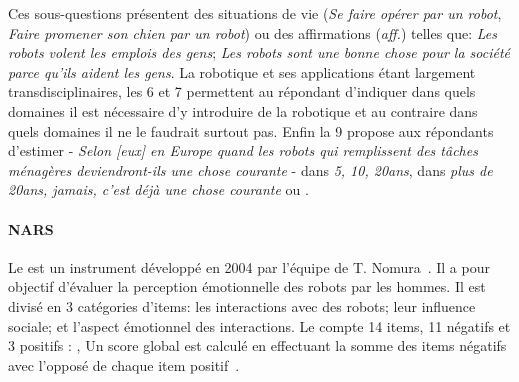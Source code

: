     Ces sous-questions présentent des situations de vie (\ie \textit{Se faire opérer par un robot}, \textit{Faire promener son chien par un robot}) ou des affirmations (\textit{aff.}) telles que: \textit{Les robots volent les emplois des gens}; \textit{Les robots sont une bonne chose pour la société parce qu'ils aident les gens}.
    La robotique et ses applications étant largement transdisciplinaires, les 6 et 7 permettent au répondant d'indiquer dans quels domaines il est nécessaire d'y introduire de la robotique et au contraire dans quels domaines il ne le faudrait surtout pas.
    Enfin la 9 propose aux répondants d'estimer - \textit{Selon [eux] en Europe quand les robots qui remplissent des tâches ménagères deviendront-ils une chose courante} - dans \textit{5, 10, 20ans}, dans \textit{plus de 20ans, jamais, c'est déjà une chose courante} ou .
    \paragraph{NARS}\label{q:nars}
    Le  est un instrument développé en 2004 par l’équipe de T. Nomura~.
    Il a pour objectif d’évaluer la perception émotionnelle des robots par les hommes. Il est divisé en 3 catégories d’items: \Li les interactions avec des robots; \ii leur influence sociale; et \iii l’aspect émotionnel des interactions.%
    Le  compte 14 items, 11 négatifs \eg {} et 3 positifs \eg: ,
    Un score global est calculé en effectuant la somme des items négatifs avec l’opposé de chaque item positif~.
